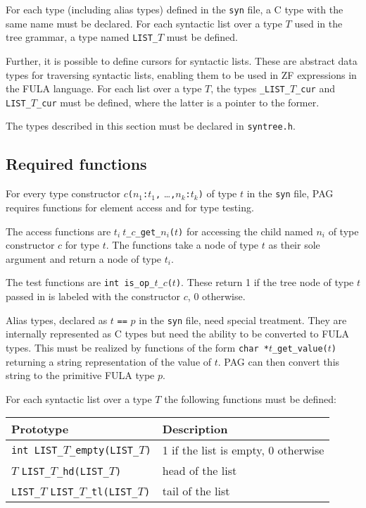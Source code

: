 For each type (including alias types) defined in the \verb|syn|
file, a C type with the same name must be declared. For each
syntactic list over a type \(T\) used in the tree grammar, a type
named \verb|LIST_|\(T\) must be defined.

Further, it is possible to define cursors for syntactic lists. These
are abstract data types for traversing syntactic lists, enabling
them to be used in ZF expressions in the FULA language. For
each list over a type \(T\), the types \verb|_LIST_|\(T\)\verb|_cur|
and \verb|LIST_|\(T\)\verb|_cur| must be defined, where the latter
is a pointer to the former.

The types described in this section must be declared in
\verb|syntree.h|.

\subsection{Required functions}

For every type constructor \(c\)\verb|(|\(n_1\)\verb|:|\(t_1\)\verb|,|
\ldots\verb|,|\(n_k\)\verb|:|\(t_k\)\verb|)| of type \(t\) in the
\verb|syn| file, PAG requires functions for element access and for
type testing.

The access functions are
\(t_i\ t\)\verb|_|\(c\)\verb|_get_|\(n_i\)\verb|(|\(t\)\verb|)| for
accessing the child named \(n_i\) of type constructor \(c\) for type
\(t\). The functions take a node of type \(t\) as their sole
argument and return a node of type \(t_i\).

The test functions are
\verb|int is_op_|\(t\)\verb|_|\(c\)\verb|(|\(t\)\verb|)|. These
return 1 if the tree node of type \(t\) passed in is labeled with
the constructor \(c\), 0 otherwise.

Alias types, declared as \(t\) \verb|==| \(p\) in the \verb|syn|
file, need special treatment. They are internally represented as C
types but need the ability to be converted to FULA types. This must
be realized by functions of the form
\verb|char *|\(t\)\verb|_get_value(|\(t\)\verb|)| returning a string
representation of the value of \(t\). PAG can then convert this
string to the primitive FULA type \(p\).

For each syntactic list over a type \(T\) the following functions
must be defined:

\begin{longtable}{|p{} | p{}|}
\hline
Prototype & Description \\
\hline
\hline \endhead
\verb|int LIST_|\(T\)\verb|_empty(LIST_|\(T\)\verb|)|
    & 1 if the list is empty, 0 otherwise \\
\hline
\(T\) \verb|LIST_|\(T\)\verb|_hd(LIST_|\(T\)\verb|)|
    & head of the list \\
\hline
\verb|LIST_|\(T\) \verb|LIST_|\(T\)\verb|_tl(LIST_|\(T\)\verb|)|
    & tail of the list \\
\hline
\end{longtable}

